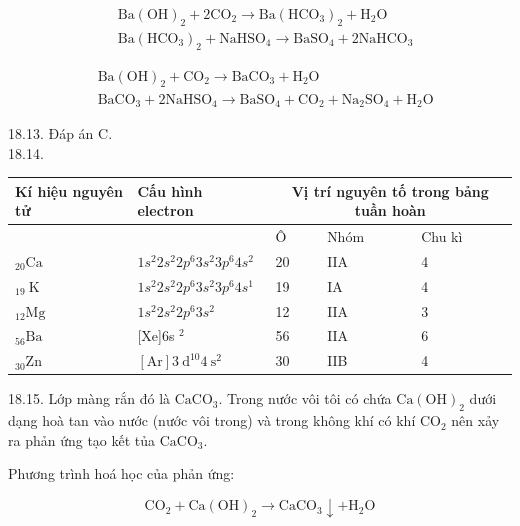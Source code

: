 \documentclass[10pt]{article}
\begin{document}
$$
\begin{aligned}
& \mathrm{Ba}(\mathrm{OH})_{2}+2 \mathrm{CO}_{2} \rightarrow \mathrm{Ba}\left(\mathrm{HCO}_{3}\right)_{2}+\mathrm{H}_{2} \mathrm{O} \\
& \mathrm{Ba}\left(\mathrm{HCO}_{3}\right)_{2}+\mathrm{NaHSO}_{4} \rightarrow \mathrm{BaSO}_{4}+2 \mathrm{NaHCO}_{3}
\end{aligned}
$$

$$
\begin{aligned}
& \mathrm{Ba}(\mathrm{OH})_{2}+\mathrm{CO}_{2} \rightarrow \mathrm{BaCO}_{3}+\mathrm{H}_{2} \mathrm{O} \\
& \mathrm{BaCO}_{3}+2 \mathrm{NaHSO}_{4} \rightarrow \mathrm{BaSO}_{4}+\mathrm{CO}_{2}+\mathrm{Na}_{2} \mathrm{SO}_{4}+\mathrm{H}_{2} \mathrm{O}
\end{aligned}
$$

18.13. Đáp án C.\\
18.14.

\begin{center}
\begin{tabular}{|l|l|l|l|l|}
\hline
\multirow{2}{*}{Kí hiệu nguyên tử} & \multirow{2}{*}{Cấu hình electron} & \multicolumn{3}{|c|}{Vị trí nguyên tố trong bảng tuần hoàn} \\
\hline
 &  & Ô & Nhóm & Chu kì \\
\hline
${ }_{20} \mathrm{Ca}$ & $1 s^{2} 2 s^{2} 2 p^{6} 3 s^{2} 3 p^{6} 4 s^{2}$ & 20 & IIA & 4 \\
\hline
${ }_{19} \mathrm{~K}$ & $1 s^{2} 2 s^{2} 2 p^{6} 3 s^{2} 3 p^{6} 4 s^{1}$ & 19 & IA & 4 \\
\hline
${ }_{12} \mathrm{Mg}$ & $1 s^{2} 2 s^{2} 2 p^{6} 3 s^{2}$ & 12 & IIA & 3 \\
\hline
${ }_{56} \mathrm{Ba}$ & [Xe]6s ${ }^{2}$ & 56 & IIA & 6 \\
\hline
${ }_{30} \mathrm{Zn}$ & $[\mathrm{Ar}] 3 \mathrm{~d}^{10} 4 \mathrm{~s}^{2}$ & 30 & IIB & 4 \\
\hline
\end{tabular}
\end{center}

18.15. Lớp màng rắn đó là $\mathrm{CaCO}_{3}$. Trong nước vôi tôi có chứa $\mathrm{Ca}(\mathrm{OH})_{2}$ dưới dạng hoà tan vào nước (nước vôi trong) và trong không khí có khí $\mathrm{CO}_{2}$ nên xảy ra phản ứng tạo kết tủa $\mathrm{CaCO}_{3}$.

Phương trình hoá học của phản ứng:

$$
\mathrm{CO}_{2}+\mathrm{Ca}(\mathrm{OH})_{2} \rightarrow \mathrm{CaCO}_{3} \downarrow+\mathrm{H}_{2} \mathrm{O}
$$
\end{document}
